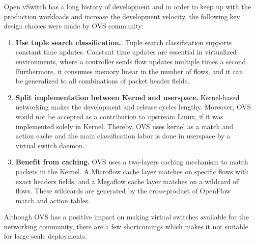 Open vSwitch has a long history of development and in order to keep up with the production 
workloads and increase the development velocity, the following key design choices were made 
by OVS community:

\begin{enumerate}
    \item \textbf{Use tuple search classification.}.  Tuple search classification supports 
    constant time updates. Constant time updates are essential in virtualized environments,
    where a controller sends flow updates multiple times a second. Furthermore, it consumes 
    memory linear in the number of flows, and it can be generalized to all combinations of 
    packet header fields.

    \item \textbf{Split implementation between Kernel and userspace.} Kernel-based networking 
    makes the development and release cycles lengthy. Moreover, OVS would not be accepted as 
    a contribution to upstream Linux, if it was implemented solely in Kernel. Thereby, OVS 
    uses kernel as a match and action cache and the main classification labor is done in 
    userspace by a virtual switch daemon.

    \item \textbf{Benefit from caching.} OVS uses a two-layers caching mechanism to match 
    packets in the Kernel. A Microflow cache layer matches on specific flows with exact 
    headers fields, and a Megaflow cache layer matches on a wildcard of flows. These wildcards 
    are generated by the cross-product of OpenFlow match and action tables.
    
\end{enumerate}

Although OVS has a positive impact on making virtual switches available for the networking 
community, there are a few shortcomings which makes it not suitable for large scale 
deployments.

